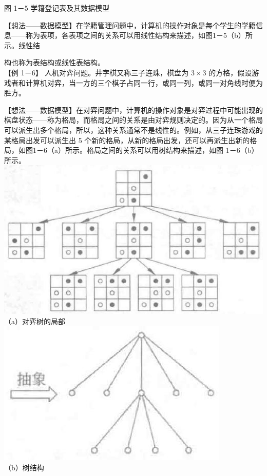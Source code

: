\documentclass[10pt]{article}
\begin{document}
图 1－5 学籍登记表及其数据模型

【想法——数据模型】在学籍管理问题中，计算机的操作对象是每个学生的学籍信息——称为表项，各表项之间的关系可以用线性结构来描述，如图1－5（b）所示。线性结

构也称为表结构或线性表结构。\\
【例 1－6】 人机对弈问题。井字棋又称三子连珠，棋盘为 $3 \times 3$ 的方格，假设游戏者和计算机对弈，当一方的三个棋子占同一行，或同一列，或同一对角线时便为胜方。

【想法——数据模型】在对弈问题中，计算机的操作对象是对弈过程中可能出现的棋盘状态——称为格局，而格局之间的关系是由对弈规则决定的。因为从一个格局可以派生出多个格局，所以，这种关系通常不是线性的。例如，从三子连珠游戏的某格局出发可以派生出 5 个新的格局，从新的格局出发，还可以再派生出新的格局，如图1－6（a）所示。格局之间的关系可以用树结构来描述，如图 1－6（b）所示。\\
\includegraphics[max width=\textwidth, center]{2025_06_06_704745ea57b15b2333e5g-021(2)}\\
（a）对弈树的局部\\
\includegraphics[max width=\textwidth, center]{2025_06_06_704745ea57b15b2333e5g-021}\\
（b）树结构
\end{document}
